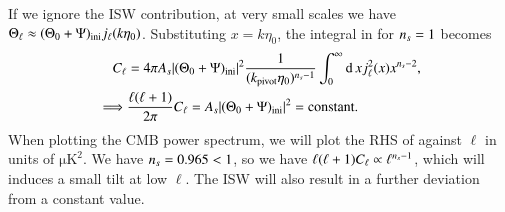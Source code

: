 If we ignore the ISW contribution, at very small scales we have $\Theta_\ell\approx (\Theta_0 + \Psi)_\mathrm{ini} j_\ell(k\eta_0)$. Substituting $x=k\eta_0$, the integral in  for $n_s=1$ becomes 
\begin{equation} \label{eq:M4:theory:C_ell_SW_plateau_integral}
    \begin{split}
        C_\ell &= 4\pi A_s \abs{(\Theta_0+\Psi)_\mathrm{ini}}^2 \frac{1}{(k_\mathrm{pivot} \eta_0)^{n_s-1}} \int_0^\infty \dd\, x j_\ell^2(x) x^{n_s-2}, \\
        \implies& \frac{\ell(\ell+1)}{2\pi}C_\ell = A_s \abs{(\Theta_0+\Psi)_\mathrm{ini}}^2 = \text{constant}.   
    \end{split}
\end{equation}
When plotting the CMB power spectrum, we will plot the RHS of  against $\ell$ in units of $\mathrm{\mu K^2}$. We have $n_s=0.965<1$, so we have $\ell(\ell+1)C_\ell\propto \ell^{n_s-1}$, which will induces a small tilt at low $\ell$. The ISW will also result in a further deviation from a constant value. 